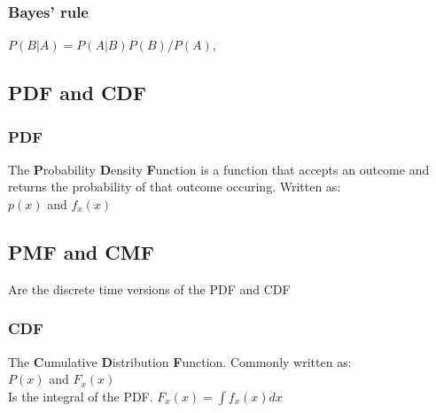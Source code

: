 \subsubsection*{Bayes' rule}
$P(B|A)=P(A|B)P(B)/P(A)$, \\

%

\subsection*{PDF and CDF}
\subsubsection*{PDF}
The {\bfseries P}robability {\bfseries D}ensity {\bfseries F}unction is a function that accepts an outcome and 
returns the probability of that outcome occuring. Written as: \\
$p(x)$ and $f_x(x)$\\
\subsection*{PMF and CMF}
Are the discrete time versions of the PDF and CDF

\subsubsection*{CDF}
The {\bfseries C}umulative {\bfseries D}istribution {\bfseries F}unction.
Commonly written as: \\
$P(x)$ and $F_x(x)$ \\
Is the integral of the PDF. 
$F_x(x)=\int f_x(x) dx$








    

